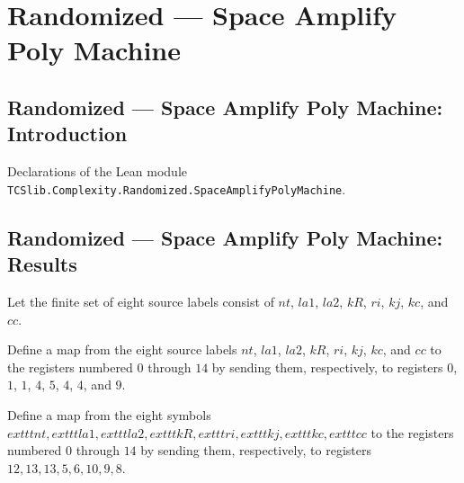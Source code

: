 \section{Randomized --- Space Amplify Poly Machine}
\subsection*{Randomized --- Space Amplify Poly Machine: Introduction}

Declarations of the Lean module \texttt{TCSlib.Complexity.Randomized.SpaceAmplifyPolyMachine}.

\subsection*{Randomized --- Space Amplify Poly Machine: Results}

\begin{definition}
\label{Randomized.PolyAmp.CpS}
\leanok
Let the finite set of eight source labels consist of $nt$, $la1$, $la2$, $kR$, $ri$,
$kj$, $kc$, and $cc$.
\end{definition}

\begin{definition}
\label{Randomized.PolyAmp.cpSrc}
\leanok
{}
Define a map from the eight source labels $nt$, $la1$, $la2$, $kR$, $ri$, $kj$, $kc$,
and $cc$ to the registers numbered $0$ through $14$ by sending them, respectively, to
registers $0$, $1$, $1$, $4$, $5$, $4$, $4$, and $9$.
\end{definition}

\begin{definition}
\label{Randomized.PolyAmp.cpDst}
\leanok
{}
Define a map from the eight symbols
$	exttt{nt},	exttt{la1},	exttt{la2},	exttt{kR},	exttt{ri},	exttt{kj},	exttt{kc},	exttt{cc}$
to the registers numbered $0$ through $14$ by sending them, respectively, to registers
$12,13,13,5,6,10,9,8$.
\end{definition}


